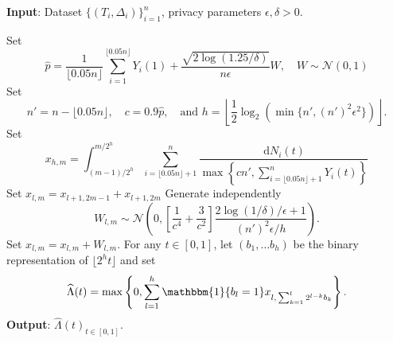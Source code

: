 \documentclass[11pt]{article}
\newcommand{\dint}{\,\mathrm{d}}
\begin{document}
\begin{algorithm}[h!]
\caption{Differentially private Nelson--Aalen estimator}
\label{alg:DP-NA}
\textbf{Input}: Dataset $\{(T_{i}, \Delta_{ i})\}_{i = 1}^{n}$, privacy parameters $\epsilon, \delta >0$.

\begin{algorithmic}[1]
\State Set 
\begin{equation*}
    \hat{p} = \frac{1}{\lfloor 0.05n \rfloor} \sum_{i=1}^{\lfloor 0.05n \rfloor} Y_i(1) + \frac{\sqrt{2 \log(1.25/\delta)}}{n \epsilon}W, \quad W \sim \mathcal{N}(0, 1)
\end{equation*}
\State Set 
\begin{equation*}
    n' = n-\lfloor0.05n\rfloor, \quad c = 0.9\hat{p}, \quad\text{and }  h=\left \lfloor \frac{1}{2} \log_2 \left( \min \{n', (n')^2 \epsilon^2\}\right) \right \rfloor.
\end{equation*}
        \State Set 
            \begin{equation*}
                x_{h, m} = \int_{(m-1)/2^h}^{m/2^h} \sum_{i=\lfloor0.05n\rfloor+1}^{n} \frac{\dint  N_{i}(t)}{\max \left\{cn', \sum_{i=\lfloor0.05n\rfloor+1}^n Y_i(t) \right\}}
            \end{equation*}
                \State Set $x_{l, m} = x_{ l+1, 2m-1} + x_{l+1, 2m}$
            \EndFor
        \EndFor
    \EndFor
            \State Generate independently \begin{equation*}
                W_{l, m} \sim \mathcal{N}\left(0, \left[\frac{1}{c^4} + \frac{3}{c^2}\right]\frac{2 \log(1/\delta)/\epsilon + 1}{(n')^2 \epsilon/h} \right).
            \end{equation*}
            \State Set $x_{ l, m} = x_{ l, m} + W_{l, m}$.
        \EndFor
    \EndFor
\State For any $t \in [0, 1]$, let $(b_1, \dots b_h)$ be the binary representation of $\lfloor 2^h t \rfloor$ and set 
    \begin{equation*}
        \widehat{\Lambda}(t) =  \max \left\{0, \sum_{l=1}^h \mathbbm{1}\{b_l = 1\} x_{l, \, \sum_{k=1}^l 2^{l-k} b_k}\right\}.  
    \end{equation*} 
\State \textbf{Output}: $\widehat{\Lambda}(t)_{t \in [0, 1]}$.
\end{algorithmic}
\end{algorithm}
\end{document}
